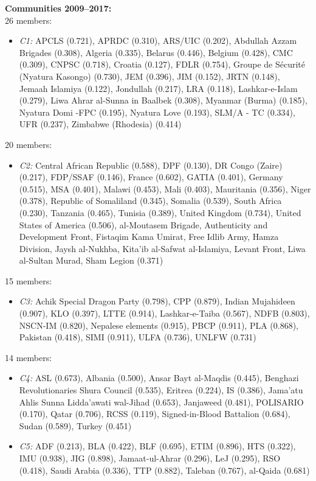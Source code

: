\textbf{Communities 2009--2017:}\\
26 members:
\begin{itemize}[noitemsep, topsep=0pt]
    \item \textit{C1:} APCLS (0.721), APRDC (0.310), ARS/UIC (0.202), Abdullah Azzam Brigades (0.308), Algeria (0.335), Belarus (0.446), Belgium (0.428), CMC (0.309), CNPSC (0.718), Croatia (0.127), FDLR (0.754), Groupe de Sécurité (Nyatura Kasongo) (0.730), JEM (0.396), JIM (0.152), JRTN (0.148), Jemaah Islamiya (0.122), Jondullah (0.217), LRA (0.118), Lashkar-e-Islam (0.279), Liwa Ahrar al-Sunna in Baalbek (0.308), Myanmar (Burma) (0.185), Nyatura Domi -FPC (0.195), Nyatura Love (0.193), SLM/A - TC (0.334), UFR (0.237), Zimbabwe (Rhodesia) (0.414)
\end{itemize}
20 members:
\begin{itemize}[noitemsep, topsep=0pt]
    \item \textit{C2:} Central African Republic (0.588), DPF (0.130), DR Congo (Zaire) (0.217), FDP/SSAF (0.146), France (0.602), GATIA (0.401), Germany (0.515), MSA (0.401), Malawi (0.453), Mali (0.403), Mauritania (0.356), Niger (0.378), Republic of Somaliland (0.345), Somalia (0.539), South Africa (0.230), Tanzania (0.465), Tunisia (0.389), United Kingdom (0.734), United States of America (0.506), al-Moutasem Brigade, Authenticity and Development Front, Fistaqim Kama Umirat, Free Idlib Army, Hamza Division, Jaysh al-Nukhba, Kita'ib al-Safwat al-Islamiya, Levant Front, Liwa al-Sultan Murad, Sham Legion (0.371)
\end{itemize}
15 members:
\begin{itemize}[noitemsep, topsep=0pt]
    \item \textit{C3:} Achik Special Dragon Party (0.798), CPP (0.879), Indian Mujahideen (0.907), KLO (0.397), LTTE (0.914), Lashkar-e-Taiba (0.567), NDFB (0.803), NSCN-IM (0.820), Nepalese elements (0.915), PBCP (0.911), PLA (0.868), Pakistan (0.418), SIMI (0.911), ULFA (0.736), UNLFW (0.731)
\end{itemize}
14 members:
\begin{itemize}[noitemsep, topsep=0pt]
    \item \textit{C4:} ASL (0.673), Albania (0.500), Ansar Bayt al-Maqdis (0.445), Benghazi Revolutionaries Shura Council (0.535), Eritrea (0.224), IS (0.386), Jama'atu Ahlis Sunna Lidda'awati wal-Jihad (0.653), Janjaweed (0.481), POLISARIO (0.170), Qatar (0.706), RCSS (0.119), Signed-in-Blood Battalion (0.684), Sudan (0.589), Turkey (0.451)
    \item \textit{C5:} ADF (0.213), BLA (0.422), BLF (0.695), ETIM (0.896), HTS (0.322), IMU (0.938), JIG (0.898), Jamaat-ul-Ahrar (0.296), LeJ (0.295), RSO (0.418), Saudi Arabia (0.336), TTP (0.882), Taleban (0.767), al-Qaida (0.681)
\end{itemize}
